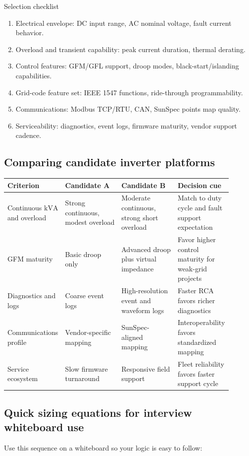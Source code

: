 \documentclass[11pt]{article}
\newcommand{\kVA}{\mathrm{kVA}}
\begin{document}
\begin{keybox}{Selection checklist}
\begin{enumerate}
  \item Electrical envelope: DC input range, AC nominal voltage, fault current behavior.
  \item Overload and transient capability: peak current duration, thermal derating.
  \item Control features: GFM/GFL support, droop modes, black-start/islanding capabilities.
  \item Grid-code feature set: IEEE 1547 functions, ride-through programmability.
  \item Communications: Modbus TCP/RTU, CAN, SunSpec points map quality.
  \item Serviceability: diagnostics, event logs, firmware maturity, vendor support cadence.
\end{enumerate}
\end{keybox}

\subsection{Comparing candidate inverter platforms}
\begin{table}[h]
\centering
\begin{tabular}{p{0.2\linewidth}p{0.25\linewidth}p{0.25\linewidth}p{0.2\linewidth}}
\toprule
Criterion & Candidate A & Candidate B & Decision cue \\
\midrule
Continuous \(\kVA\) and overload & Strong continuous, modest overload & Moderate continuous, strong short overload & Match to duty cycle and fault support expectation \\
GFM maturity & Basic droop only & Advanced droop plus virtual impedance & Favor higher control maturity for weak-grid projects \\
Diagnostics and logs & Coarse event logs & High-resolution event and waveform logs & Faster RCA favors richer diagnostics \\
Communications profile & Vendor-specific mapping & SunSpec-aligned mapping & Interoperability favors standardized mapping \\
Service ecosystem & Slow firmware turnaround & Responsive field support & Fleet reliability favors faster support cycle \\
\bottomrule
\end{tabular}
\end{table}

\subsection{Quick sizing equations for interview whiteboard use}
Use this sequence on a whiteboard so your logic is easy to follow:
\end{document}

